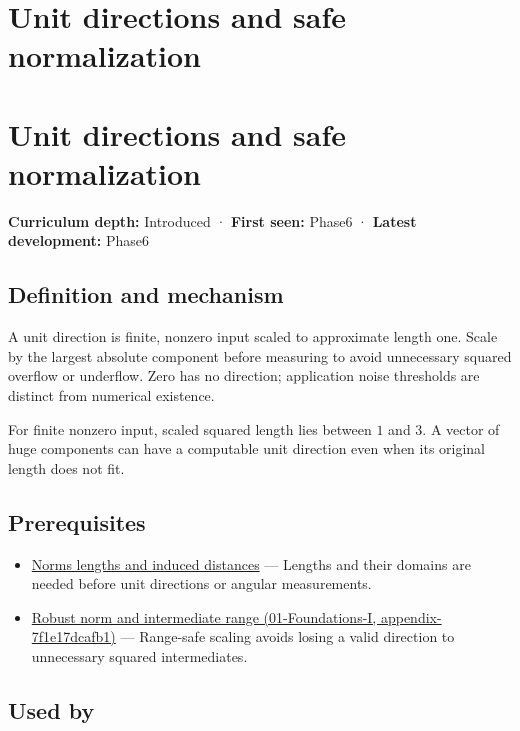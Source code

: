 \hypertarget{appendix-f744e41b95b4}{}
\section*{Unit directions and safe normalization}
\section{Unit directions and safe normalization}\label{unit-directions-and-safe-normalization}

\textbf{Curriculum depth:} Introduced · \textbf{First seen:} Phase6 · \textbf{Latest development:} Phase6

\subsection{Definition and mechanism}\label{definition-and-mechanism}

A unit direction is finite, nonzero input scaled to approximate length one. Scale by the largest absolute component before measuring to avoid unnecessary squared overflow or underflow. Zero has no direction; application noise thresholds are distinct from numerical existence.

For finite nonzero input, scaled squared length lies between \(1\) and \(3\). A vector of huge components can have a computable unit direction even when its original length does not fit.

\subsection{Prerequisites}\label{prerequisites}

\begin{itemize}
\tightlist
\item
  \hyperref[appendix-49933872bb51]{Norms lengths and induced distances} --- Lengths and their domains are needed before unit directions or angular measurements.
\item
  \href{}{Robust norm and intermediate range (01-Foundations-I, appendix-7f1e17dcafb1)} --- Range-safe scaling avoids losing a valid direction to unnecessary squared intermediates.
\end{itemize}

\subsection{Used by}\label{used-by}

